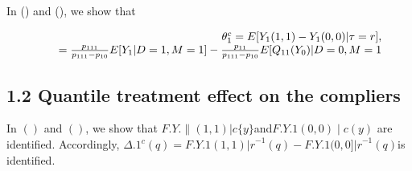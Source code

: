 \documentclass{article}
\begin{document}
In () and (), we show that


\begin{equation}
\begin{array} { r l r } & { } & { \theta _ { 1 } ^ { c } = E [ Y _ { 1 } ( 1, 1 ) - Y _ { 1 } ( 0, 0 ) | \tau = r ], } \\ & { } & { = \frac { p _ { 1 1 1 } } { p _ { 1 1 1 } - p _ { 1 0 } } E [ Y _ { 1 } | D = 1, M = 1 ] - \frac { p _ { 1 1 } } { p _ { 1 1 1 } - p _ { 1 0 } } E [ Q _ { 1 1 } ( Y _ { 0 } ) | D = 0, M = 1}\end{array}
\end{equation}


\subsection*{1.2 Quantile treatment effect on the compliers}


In $( )$ and $\left ( \right )$, we show that $F . { Y . { \parallel } ( 1, 1 ) | c } \{ y \}$and$F . { Y . { 1 } ( 0, 0 ) \mid c } ( y )$ are identified. Accordingly,
$\Delta . { 1 } ^ { c } ( q ) = F . { Y . { 1 } ( 1, 1 ) | r } ^ { - 1 } ( q ) - F . { Y . { 1 } ( 0, 0 ] | r } ^ { - 1 } ( q )$is identified.
\end{document}
